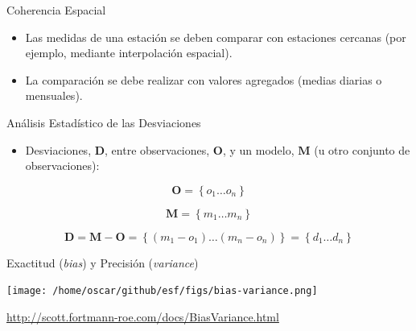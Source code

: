 \documentclass[xcolor={usenames,svgnames,dvipsnames}]{beamer}
\begin{document}
\begin{frame}[label={sec:org409790f}]{Coherencia Espacial}
\begin{itemize}
\item Las medidas de una estación se deben comparar con \alert{estaciones cercanas} (por ejemplo, mediante interpolación espacial).
\item La comparación se debe realizar con \alert{valores agregados} (medias diarias o mensuales).
\end{itemize}
\end{frame}

\begin{frame}[label={sec:org48b1787}]{Análisis Estadístico de las Desviaciones}
\begin{itemize}
\item Desviaciones, \(\mathbf{D}\), entre observaciones, \(\mathbf{O}\), y un modelo, \(\mathbf{M}\) (u otro conjunto de observaciones):
\end{itemize}

\[
\mathbf{O} = \left\{ o_1 \dots o_n \right\}
\]

\[
\mathbf{M} = \left\{ m_1 \dots m_n  \right\}
\]

\[
\mathbf{D} = \mathbf{M} - \mathbf{O} =  \left\{ (m_1 - o_1) \dots (m_n - o_n)  \right\} = \left\{ d_1 \dots d_n  \right\}
\]
\end{frame}

\begin{frame}[label={sec:orgddbd671}]{Exactitud (\emph{bias}) y Precisión (\emph{variance})}
\begin{center}
\texttt{[image: /home/oscar/github/esf/figs/bias-variance.png]}
\end{center}

\url{http://scott.fortmann-roe.com/docs/BiasVariance.html}
\end{frame}
\end{document}
